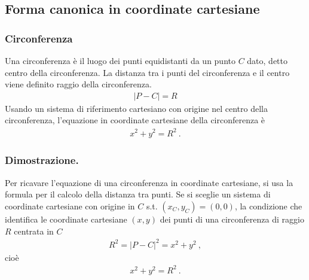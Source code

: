 \documentclass[letterpaper,10pt,english]{jupyterBook}
\begin{document}
\sphinxstepscope


\subsection{Forma canonica in coordinate cartesiane}
\label{\detokenize{ch/analytic_geometry/analytic_geometry_2d/conics-cartesian:forma-canonica-in-coordinate-cartesiane}}\label{\detokenize{ch/analytic_geometry/analytic_geometry_2d/conics-cartesian:geometry-analytic-2d-conics-cartesian}}\label{\detokenize{ch/analytic_geometry/analytic_geometry_2d/conics-cartesian::doc}}

\subsubsection{Circonferenza}
\label{\detokenize{ch/analytic_geometry/analytic_geometry_2d/conics-cartesian:circonferenza}}
\sphinxAtStartPar
Una circonferenza è il luogo dei punti equidistanti da un punto \(C\) dato, detto centro della circonferenza. La distanza tra i punti del circonferenza e il centro viene definito raggio della circonferenza.
\begin{equation*}
\begin{split}|P - C| = R\end{split}
\end{equation*}
\sphinxAtStartPar
Usando un sistema di riferimento cartesiano con origine nel centro della circonferenza, l’equazione in coordinate cartesiane della circonferenza è
\begin{equation*}
\begin{split}x^2 + y^2 = R^2 \ .\end{split}
\end{equation*}\subsubsection*{Dimostrazione.}

\sphinxAtStartPar
Per ricavare l’equazione di una circonferenza in coordinate cartesiane, si usa la formula per il calcolo della distanza tra punti. Se si sceglie un sistema di coordinate cartesiane con origine in \(C\) s.t. \((x_C, y_C) = (0,0)\), la condizione che identifica le coordinate cartesiane \((x,y)\) dei punti di una circonferenza di raggio \(R\) centrata in \(C\)
\begin{equation*}
\begin{split}R^2 = |P-C|^2 = x^2 + y^2 \ ,\end{split}
\end{equation*}
\sphinxAtStartPar
cioè
\begin{equation*}
\begin{split}x^2 + y^2 = R^2 \ .\end{split}
\end{equation*}
\end{document}
